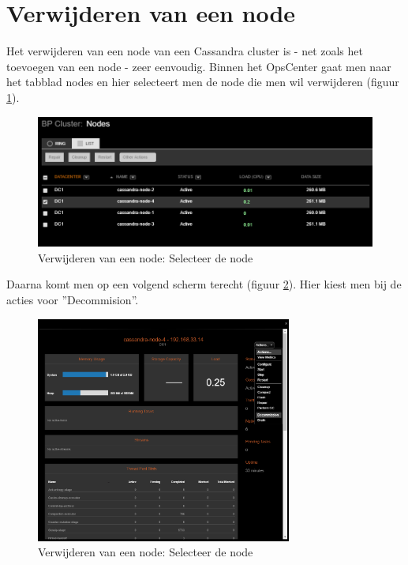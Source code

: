 \section{Verwijderen van een node}
Het verwijderen van een node van een Cassandra cluster is - net zoals het toevoegen van een node - zeer eenvoudig.
Binnen het OpsCenter gaat men naar het tabblad nodes en hier selecteert men de node die men wil verwijderen (figuur \ref{fig:cas_rem_1}).

\begin{figure}[H]
	\centering
	\includegraphics[width=1\textwidth]{img/4_installatie_cassandra/5_Remove_Node_1}
	\caption{Verwijderen van een node: Selecteer de node}
	\label{fig:cas_rem_1}
\end{figure}

Daarna komt men op een volgend scherm terecht (figuur \ref{fig:cas_rem_2}).
Hier kiest men bij de acties voor ''Decommision''.

\begin{figure}[H]
	\centering
	\includegraphics[width=0.75\textwidth]{img/4_installatie_cassandra/5_Remove_Node_2}
	\caption{Verwijderen van een node: Selecteer de node}
	\label{fig:cas_rem_2}
\end{figure}

